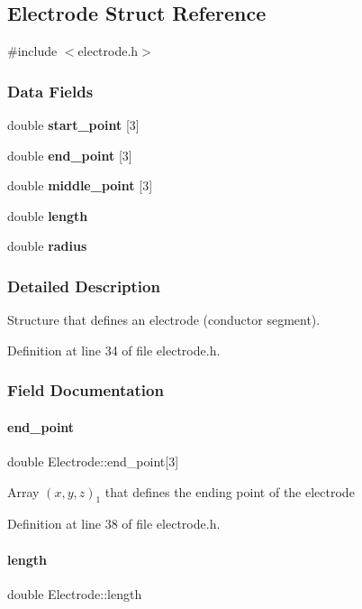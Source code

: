 \subsection{Electrode Struct Reference}
\label{structElectrode}


{\ttfamily \#include $<$electrode.\+h$>$}

\subsubsection*{Data Fields}
\begin{DoxyCompactItemize}
\item 
double \textbf{ start\+\_\+point} [3]
\item 
double \textbf{ end\+\_\+point} [3]
\item 
double \textbf{ middle\+\_\+point} [3]
\item 
double \textbf{ length}
\item 
double \textbf{ radius}
\end{DoxyCompactItemize}


\subsubsection{Detailed Description}
Structure that defines an electrode (conductor segment). 

Definition at line 34 of file electrode.\+h.



\subsubsection{Field Documentation}
\mbox{\label{structElectrode_acbabc3915b91689330d88b0571a72687}} 
\paragraph{end\_point}
{\footnotesize\ttfamily double Electrode\+::end\+\_\+point[3]}

Array $(x,y,z)_1$ that defines the ending point of the electrode 

Definition at line 38 of file electrode.\+h.

\mbox{\label{structElectrode_adbb0c50177021fdefad744186a63cfce}} 
\paragraph{length}
{\footnotesize\ttfamily double Electrode\+::length}

